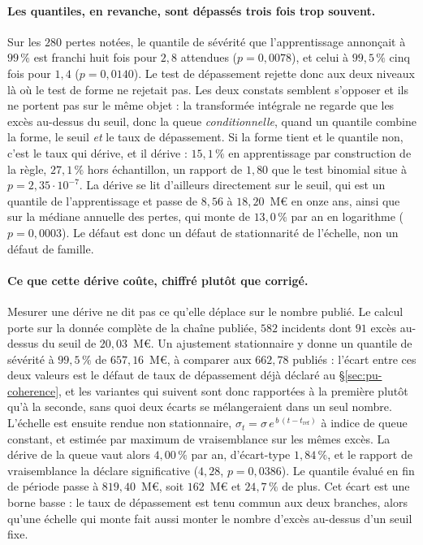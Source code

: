 \paragraph{Les quantiles, en revanche, sont dépassés trois fois trop souvent.} Sur les $280$
pertes notées, le quantile de sévérité que l'apprentissage annonçait à $99\,\%$ est franchi huit
fois pour $2{,}8$ attendues ($p=0{,}0078$), et celui à $99{,}5\,\%$ cinq fois pour $1{,}4$
($p=0{,}0140$). Le test de dépassement rejette donc aux deux niveaux là où le test de forme ne
rejetait pas. Les deux constats semblent s'opposer et ils ne portent pas sur le même objet : la
transformée intégrale ne regarde que les excès au-dessus du seuil, donc la queue
\emph{conditionnelle}, quand un quantile combine la forme, le seuil \emph{et} le taux de
dépassement. Si la forme tient et le quantile non, c'est le taux qui dérive, et il dérive :
$15{,}1\,\%$ en apprentissage par construction de la règle, $27{,}1\,\%$ hors échantillon, un
rapport de $1{,}80$ que le test binomial situe à $p=2{,}35\cdot 10^{-7}$. La dérive se lit
d'ailleurs directement sur le seuil, qui est un quantile de l'apprentissage et passe de
$8{,}56$ à $18{,}20$~M\euro{} en onze ans, ainsi que sur la médiane annuelle des pertes, qui
monte de $13{,}0\,\%$ par an en logarithme ($p=0{,}0003$). Le défaut est donc un défaut de
stationnarité de l'échelle, non un défaut de famille.

\paragraph{Ce que cette dérive coûte, chiffré plutôt que corrigé.} Mesurer une dérive ne dit pas
ce qu'elle déplace sur le nombre publié. Le calcul porte sur la donnée complète de la chaîne
publiée, $582$ incidents dont $91$ excès au-dessus du seuil de $20{,}03$~M\euro. Un ajustement
stationnaire y donne un quantile de sévérité à $99{,}5\,\%$ de $657{,}16$~M\euro, à comparer aux
$662{,}78$ publiés : l'écart entre ces deux valeurs est le défaut de taux de dépassement déjà
déclaré au \S\ref{sec:pu-coherence}, et les variantes qui suivent sont donc rapportées à la
première plutôt qu'à la seconde, sans quoi deux écarts se mélangeraient dans un seul nombre.
L'échelle est ensuite rendue non stationnaire, $\sigma_t = \sigma\,e^{\,b\,(t-t_{\mathrm{ref}})}$
à indice de queue constant, et estimée par maximum de vraisemblance sur les mêmes excès. La
dérive de la queue vaut alors $4{,}00\,\%$ par an, d'écart-type $1{,}84\,\%$, et le rapport de
vraisemblance la déclare significative ($4{,}28$, $p=0{,}0386$). Le quantile évalué en fin de
période passe à $819{,}40$~M\euro, soit $162$~M\euro{} et $24{,}7\,\%$ de plus. Cet écart est une
borne basse : le taux de dépassement est tenu commun aux deux branches, alors qu'une
échelle qui monte fait aussi monter le nombre d'excès au-dessus d'un seuil fixe.

